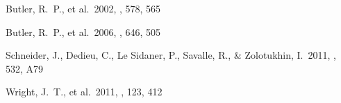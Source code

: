 \begin{thebibliography}

 Butler, R.~P., et al.\ 2002, 
\apj, 578, 565

 Butler, R.~P., et al.\ 2006, 
\apj, 646, 505 

 Schneider, J., Dedieu, C., 
Le Sidaner, P., Savalle, R., \& Zolotukhin, I.\ 2011, \aap, 532, A79 

 Wright, J.~T., et al.\ 2011, \pasp, 123, 412

\end{thebibliography}
